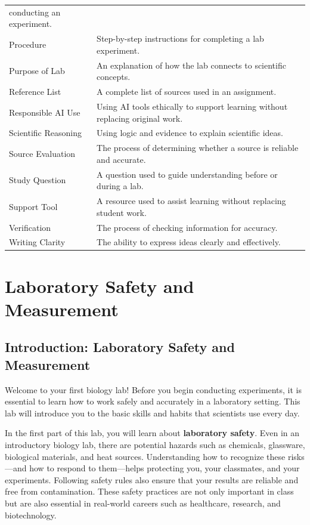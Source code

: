 \documentclass[
  letterpaper,
  DIV=11,
  numbers=noendperiod]{scrreprt}
\begin{document}
{\begin{longtable}[]{@{}
  >{\raggedright\arraybackslash}p{}
  >{\raggedright\arraybackslash}p{}@{}}
conducting an experiment. \\
Procedure & Step-by-step instructions for completing a lab
experiment. \\
Purpose of Lab & An explanation of how the lab connects to scientific
concepts. \\
Reference List & A complete list of sources used in an assignment. \\
Responsible AI Use & Using AI tools ethically to support learning
without replacing original work. \\
Scientific Reasoning & Using logic and evidence to explain scientific
ideas. \\
Source Evaluation & The process of determining whether a source is
reliable and accurate. \\
Study Question & A question used to guide understanding before or during
a lab. \\
Support Tool & A resource used to assist learning without replacing
student work. \\
Verification & The process of checking information for accuracy. \\
Writing Clarity & The ability to express ideas clearly and
effectively. \\
\end{longtable}
}


\chapter{\texorpdfstring{\textbf{Laboratory Safety and
Measurement}}{Laboratory Safety and Measurement}}\label{laboratory-safety-and-measurement}

\section{\texorpdfstring{\textbf{Introduction: Laboratory Safety and
Measurement}}{Introduction: Laboratory Safety and Measurement}}\label{introduction-laboratory-safety-and-measurement}

Welcome to your first biology lab! Before you begin conducting
experiments, it is essential to learn how to work safely and accurately
in a laboratory setting. This lab will introduce you to the basic skills
and habits that scientists use every day.

In the first part of this lab, you will learn about \textbf{laboratory
safety}. Even in an introductory biology lab, there are potential
hazards such as chemicals, glassware, biological materials, and heat
sources. Understanding how to recognize these risks---and how to respond
to them---helps protecting you, your classmates, and your experiments.
Following safety rules also ensure that your results are reliable and
free from contamination. These safety practices are not only important
in class but are also essential in real-world careers such as
healthcare, research, and biotechnology.
\end{document}

